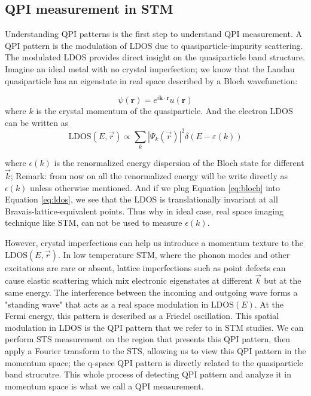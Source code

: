 \subsection{QPI measurement in STM}
Understanding QPI patterns is the first step to understand QPI measurement. A QPI pattern is the modulation of \ac{LDOS} due to quasiparticle-impurity scattering. The modulated \ac{LDOS} provides direct insight on the quasiparticle band structure. Imagine an ideal metal with no crystal imperfection; we know that the Landau quasiparticle has an eigenstate in real space described by a Bloch wavefunction: 

\begin{equation}
\psi(\mathbf{r}) = e^{i \mathbf{k} \cdot \mathbf{r}} u(\mathbf{r})
\label{eq:bloch}
\end{equation} 
where $k$ is the crystal momentum of the quasiparticle. And the electron \ac{LDOS} can be written as  
\begin{equation}
\text{LDOS}(E, \vec{r}) \propto \sum_k |\Psi_k(\vec{r})|^2 \delta(E - \varepsilon(k))
\label{eq:ldos}
\end{equation}

where  $\epsilon(k)$ is the renormalized energy dispersion of the Bloch state for different $\vec{k}$; Remark: from now on all the renormalized energy will be write directly as $\epsilon(k)$ unless otherwise mentioned. And if we plug Equation \ref{eq:bloch} into Equation \ref{eq:ldos}, we see that the $\text{LDOS}$ is translationally invariant at all Bravais-lattice-equivalent points. Thus why in ideal case, real space imaging technique like \ac{STM}, can not be used to measure $\epsilon(k)$. 

However, crystal imperfections can help us introduce a momentum texture to the $\text{LDOS}(E, \vec{r})$. In low temperature STM, where the phonon modes and other excitations are rare or absent, lattice imperfections such as point defects can cause elastic scattering which mix electronic eigenstates at different $\vec{k}$ but at the same energy. The interference between the incoming and outgoing wave forms a "standing wave" that acts as a real space modulation in $\text{LDOS}(E)$. At the Fermi energy, this pattern is described as a Friedel oscillation\cite{benaFriedelOscillationsDecoding2016}. This spatial modulation in $\text{LDOS}$ is the QPI pattern that we refer to in \ac{STM} studies. We can perform \ac{STS} measurement on the region that presents this QPI pattern, then apply a Fourier transform to the STS, allowing us to view this QPI pattern in the momentum space; the q-space QPI pattern is directly related to the quasiparticle band strucutre. This whole process of detecting QPI pattern and analyze it in momentum space is what we call a QPI measurement. 

